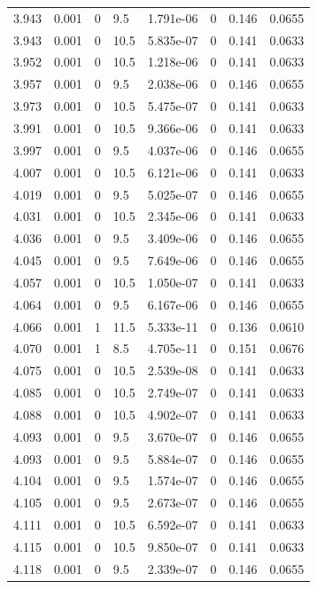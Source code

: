 \documentclass[preview]{standalone}
\begin{document}
{{{{{{{{{{{{\begin{tabular}{L{1.2cm}C{1.2cm} C{0.3cm}C{0.5cm} C{1.4cm}C{1.4cm} C{1.4cm}C{1.4cm}}
  3.943  &  0.001  & 0     & 9.5 &  1.791e-06  & 0  & 0.146 &  0.0655   \\ 
  3.943  &  0.001  & 0     & 10.5 &  5.835e-07  & 0  & 0.141 &  0.0633   \\ 
  3.952  &  0.001  & 0     & 10.5 &  1.218e-06  & 0  & 0.141 &  0.0633   \\ 
  3.957  &  0.001  & 0     & 9.5 &  2.038e-06  & 0  & 0.146 &  0.0655   \\ 
  3.973  &  0.001  & 0     & 10.5 &  5.475e-07  & 0  & 0.141 &  0.0633   \\ 
  3.991  &  0.001  & 0     & 10.5 &  9.366e-06  & 0  & 0.141 &  0.0633   \\ 
  3.997  &  0.001  & 0     & 9.5 &  4.037e-06  & 0  & 0.146 &  0.0655   \\ 
  4.007  &  0.001  & 0     & 10.5 &  6.121e-06  & 0  & 0.141 &  0.0633   \\ 
  4.019  &  0.001  & 0     & 9.5 &  5.025e-07  & 0  & 0.146 &  0.0655   \\ 
  4.031  &  0.001  & 0     & 10.5 &  2.345e-06  & 0  & 0.141 &  0.0633   \\ 
  4.036  &  0.001  & 0     & 9.5 &  3.409e-06  & 0  & 0.146 &  0.0655   \\ 
  4.045  &  0.001  & 0     & 9.5 &  7.649e-06  & 0  & 0.146 &  0.0655   \\ 
  4.057  &  0.001  & 0     & 10.5 &  1.050e-07  & 0  & 0.141 &  0.0633   \\ 
  4.064  &  0.001  & 0     & 9.5 &  6.167e-06  & 0  & 0.146 &  0.0655   \\ 
  4.066  &  0.001  & 1     & 11.5 &  5.333e-11  & 0  & 0.136 &  0.0610   \\ 
  4.070  &  0.001  & 1     & 8.5 &  4.705e-11  & 0  & 0.151 &  0.0676   \\ 
  4.075  &  0.001  & 0     & 10.5 &  2.539e-08  & 0  & 0.141 &  0.0633   \\ 
  4.085  &  0.001  & 0     & 10.5 &  2.749e-07  & 0  & 0.141 &  0.0633   \\ 
  4.088  &  0.001  & 0     & 10.5 &  4.902e-07  & 0  & 0.141 &  0.0633   \\ 
  4.093  &  0.001  & 0     & 9.5 &  3.670e-07  & 0  & 0.146 &  0.0655   \\ 
  4.093  &  0.001  & 0     & 9.5 &  5.884e-07  & 0  & 0.146 &  0.0655   \\ 
  4.104  &  0.001  & 0     & 9.5 &  1.574e-07  & 0  & 0.146 &  0.0655   \\ 
  4.105  &  0.001  & 0     & 9.5 &  2.673e-07  & 0  & 0.146 &  0.0655   \\ 
  4.111  &  0.001  & 0     & 10.5 &  6.592e-07  & 0  & 0.141 &  0.0633   \\ 
  4.115  &  0.001  & 0     & 10.5 &  9.850e-07  & 0  & 0.141 &  0.0633   \\ 
  4.118  &  0.001  & 0     & 9.5 &  2.339e-07  & 0  & 0.146 &  0.0655   \\ 
\hline 
\end{tabular} 

}}}}}}}}}}}}
\end{document}
